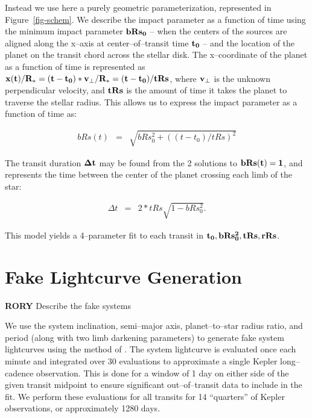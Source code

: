 
Instead we use here a purely geometric parameterization, represented
in Figure~\ref{fig-schem}.  We describe the impact parameter as a
function of time using the minimum impact parameter ${\bf bRs_0}$ --
when the centers of the sources are aligned along the x--axis at
center--of--transit time ${\bf t_0}$ -- and the location of the planet
on the transit chord across the stellar disk.  The x--coordinate of
the planet as a function of time is represented as ${\bf x(t) / R_* =
  (t - t_0) * v_\perp / R_* = (t - t_0) / tRs}$, where ${\bf v_\perp}$
is the unknown perpendicular velocity, and ${\bf tRs}$ is the amount
of time it takes the planet to traverse the stellar radius.  This
allows us to express the impact parameter as a function of time as:

\begin{eqnarray}
bRs(t) & = & \sqrt{bRs_0^2 + \left((t - t_0) / tRs\right)^2}
\end{eqnarray}

The transit duration ${\bf \Delta t}$ may be found from the 2
solutions to ${\bf bRs(t) = 1}$, and represents the time between the
center of the planet crossing each limb of the star:

\begin{eqnarray}
\Delta t & = & 2 * tRs \sqrt{1 - bRs_0^2}.
\label{eq-dt}
\end{eqnarray}


This model yields a 4--parameter fit to each transit in ${\bf t_0,
  bRs_0^2, tRs, rRs}$.

\section{Fake Lightcurve Generation}

{\bf RORY} Describe the fake systems

We use the system inclination, semi--major axis, planet--to--star
radius ratio, and period (along with two limb darkening parameters) to
generate fake system lightcurves using the method of
\cite{2002ApJ...580L.171M}.  The system lightcurve is evaluated once
each minute and integrated over 30 evaluations to approximate a single
Kepler long--cadence observation.  This is done for a window of 1 day
on either side of the given transit midpoint to ensure significant
out--of--transit data to include in the fit.  We perform these
evaluations for all transits for 14 ``quarters'' of Kepler
observations, or approximately 1280 days.

